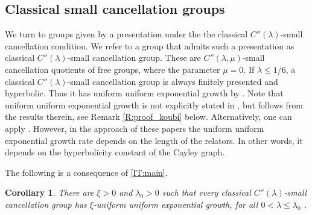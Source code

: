\documentclass[leqno,a4paper,10pt]{amsart}
\theoremstyle{plain}
\newtheorem{cor}[thm]{Corollary}
\theoremstyle{definition}
\theoremstyle{remark}
\begin{document}
\subsection{Classical small cancellation groups} \label{S:classical small cancellation}
We turn to groups given by a presentation under the the classical $C''(\lambda)$-small cancellation condition. We refer to a group that admits such a presentation as classical $C''(\lambda)$-small cancellation group. These are $C''(\lambda,\mu)$-small cancellation quotients of  free groups, where the parameter $\mu=0$. If $\lambda \leqslant 1/6$, a classical $C''(\lambda)$-small cancellation group is always finitely presented and hyperbolic. Thus it has uniform uniform exponential growth by \cite{gromov_hyperbolic_1987, koubi_croissance_1998}. Note that uniform uniform exponential growth is not explicitly stated in \cite{koubi_croissance_1998}, but follows from the results therein, see Remark \ref{R:proof_koubi} below. %
Alternatively, one can apply \cite{arzhantseva_lower_2006}. %
However, in the approach of these papers the uniform uniform exponential growth rate depends on the length of the relators. In other words, it depends on the hyperbolicity constant of the Cayley graph. 



 The following is a consequence of \autoref{IT:main}.

\begin{cor}
	\label{IT:growth-small-cancellation}
	There are $\xi>0$ and $\lambda_0>0$ such that every classical $C''(\lambda)$-small cancellation group has $\xi$-uniform uniform exponential growth, for all $0<\lambda \leqslant \lambda_0$ .
\end{cor}
\end{document}
